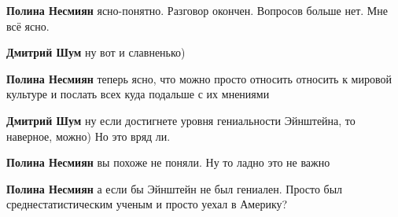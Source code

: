 \begin{itemize}
\begin{itemize}
\textbf{Полина Несмиян} ясно-понятно. Разговор окончен. Вопросов больше нет. Мне всё ясно.

 
\textbf{Дмитрий Шум} ну вот и славненько)

 
\textbf{Полина Несмиян} теперь ясно, что можно просто относить относить к мировой культуре и послать всех куда подальше с их мнениями

 
\textbf{Дмитрий Шум} ну если достигнете уровня гениальности Эйнштейна, то наверное, можно) Но это вряд ли.

 
\textbf{Полина Несмиян} вы похоже не поняли. Ну то ладно это не важно

 
\textbf{Полина Несмиян} а если бы Эйнштейн не был гениален. Просто был среднестатистическим ученым и просто уехал в Америку?

 

\end{itemize}
\end{itemize}
